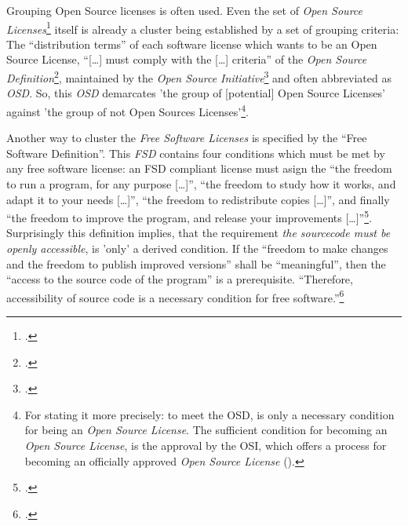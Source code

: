 Grouping Open Source licenses is often used. Even the set of \emph{Open Source
Li\-cen\-ses}\footcite[cf.][\nopage wp]{OSI2012b} itself is already a cluster
being established by a set of grouping criteria: The \enquote{distribution
terms} of each software license which wants to be an Open Source License,
\enquote{[\ldots] must comply with the [\ldots] criteria} of the \emph{Open
Source Definition}\footcite[cf.][\nopage wp]{OSI2012a}, maintained by the
\emph{Open Source Initiative}\footcite[cf.][\nopage wp]{OSI2012c} and often
abbreviated as \emph{OSD}. So, this \emph{OSD} demarcates 'the group of
[potential] Open Source Licenses' against 'the group of not Open Sources
Licenses'\footnote{For stating it more precisely: to meet the OSD, is only a
necessary condition for being an \emph{Open Source License}. The sufficient
condition for becoming an \emph{Open Source License}, is the approval by the
OSI, which offers a process for becoming an officially approved \emph{Open
Source License} (\cite[cf.][\nopage wp.]{OSI2012d}).}.

Another way to cluster the \emph{Free Software Licenses} is specified by the
\enquote{Free Software Definition}. This \emph{FSD} contains four conditions
which must be met by any free software license: an FSD compliant license must
asign the \enquote{the freedom to run a program, for any purpose [\ldots]},
\enquote{the freedom to study how it works, and adapt it to your needs
[\ldots]}, \enquote{the freedom to redistribute copies [\ldots]}, and finally
\enquote{the freedom to improve the program, and release your improvements
[\ldots]}\footcite[cf.][41]{Stallman1996a}. Surprisingly this definition
implies, that the requirement \emph{the sourcecode must be openly accessible},
is 'only' a derived condition. If the \enquote{freedom to make changes and the
freedom to publish improved versions} shall be \enquote{meaningful}, then the
\enquote{access to the source code of the program} is a prerequisite.
\enquote{Therefore, accessibility of source code is a necessary condition for
free software.}\footcite[cf.][41]{Stallman1996a}

